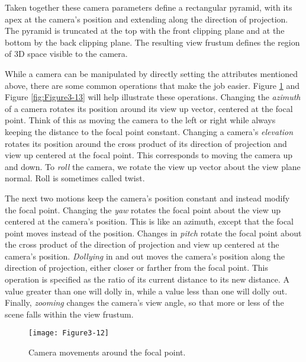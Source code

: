 Taken together these camera parameters define a rectangular pyramid, with its apex at the camera's position and extending along the direction of projection. The pyramid is truncated at the top with the front clipping plane and at the bottom by the back clipping plane. The resulting view frustum defines the region of 3D space visible to the camera.

While a camera can be manipulated by directly setting the attributes mentioned above, there are some common operations that make the job easier. Figure \ref{fig:Figure3-12} and Figure \ref{fig:Figure3-13} will help illustrate these operations. Changing the \emph{azimuth} of a camera rotates its position around its view up vector, centered at the focal point. Think of this as moving the camera to the left or right while always keeping the distance to the focal point constant. Changing a camera's \emph{elevation} rotates its position around the cross product of its direction of projection and view up centered at the focal point. This corresponds to moving the camera up and down. To \emph{roll} the camera, we rotate the view up vector about the view plane normal. Roll is sometimes called twist.

The next two motions keep the camera's position constant and instead modify the focal point. Changing the \emph{yaw} rotates the focal point about the view up centered at the camera's position. This is like an azimuth, except that the focal point moves instead of the position. Changes in \emph{pitch} rotate the focal point about the cross product of the direction of projection and view up centered at the camera's position. \emph{Dollying} in and out moves the camera's position along the direction of projection, either closer or farther from the focal point. This operation is specified as the ratio of its current distance to its new distance. A value greater than one will dolly in, while a value less than one will dolly out. Finally, \emph{zooming} changes the camera's view angle, so that more or less of the scene falls within the view frustum.

\begin{figure}[!htb]
  \centering
  \texttt{[image: Figure3-12]}\\
  \caption{Camera movements around the focal point.}\label{fig:Figure3-12}
\end{figure}

